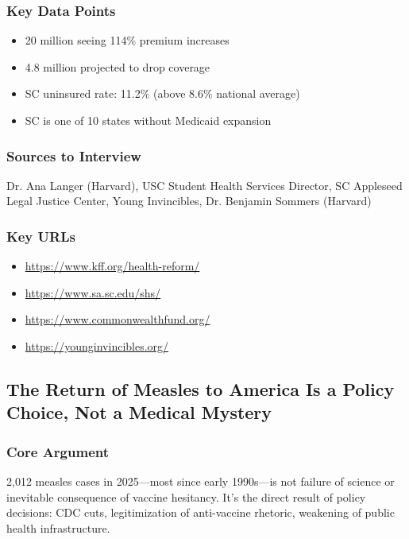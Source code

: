 \documentclass[11pt,letterpaper]{article}
\begin{document}
\subsubsection*{Key Data Points}
\begin{itemize}[noitemsep]
    \item 20 million seeing 114\% premium increases
    \item 4.8 million projected to drop coverage
    \item SC uninsured rate: 11.2\% (above 8.6\% national average)
    \item SC is one of 10 states without Medicaid expansion
\end{itemize}

\subsubsection*{Sources to Interview}
Dr. Ana Langer (Harvard), USC Student Health Services Director, SC Appleseed Legal Justice Center, Young Invincibles, Dr. Benjamin Sommers (Harvard)

\subsubsection*{Key URLs}
\begin{itemize}[noitemsep]
    \item \url{https://www.kff.org/health-reform/}
    \item \url{https://www.sa.sc.edu/shs/}
    \item \url{https://www.commonwealthfund.org/}
    \item \url{https://younginvincibles.org/}
\end{itemize}

\newpage
\subsection{The Return of Measles to America Is a Policy Choice, Not a Medical Mystery}

\subsubsection*{Core Argument}
2,012 measles cases in 2025---most since early 1990s---is not failure of science or inevitable consequence of vaccine hesitancy. It's the direct result of policy decisions: CDC cuts, legitimization of anti-vaccine rhetoric, weakening of public health infrastructure.
\end{document}
